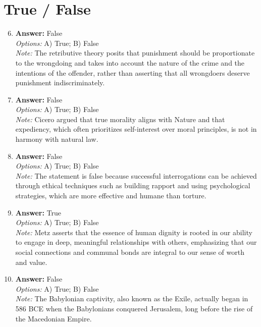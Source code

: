 \documentclass[12pt]{article}
\begin{document}
\section*{True / False}
\begin{enumerate}[label=\arabic*.]
\setcounter{enumi}{5}
\item \textbf{Answer:} False
\\ \textit{Options:} A) True; B) False
\\ \textit{Note:} The retributive theory posits that punishment should be proportionate to the wrongdoing and takes into account the nature of the crime and the intentions of the offender, rather than asserting that all wrongdoers deserve punishment indiscriminately.
\item \textbf{Answer:} False
\\ \textit{Options:} A) True; B) False
\\ \textit{Note:} Cicero argued that true morality aligns with Nature and that expediency, which often prioritizes self-interest over moral principles, is not in harmony with natural law.
\item \textbf{Answer:} False
\\ \textit{Options:} A) True; B) False
\\ \textit{Note:} The statement is false because successful interrogations can be achieved through ethical techniques such as building rapport and using psychological strategies, which are more effective and humane than torture.
\item \textbf{Answer:} True
\\ \textit{Options:} A) True; B) False
\\ \textit{Note:} Metz asserts that the essence of human dignity is rooted in our ability to engage in deep, meaningful relationships with others, emphasizing that our social connections and communal bonds are integral to our sense of worth and value.
\item \textbf{Answer:} False
\\ \textit{Options:} A) True; B) False
\\ \textit{Note:} The Babylonian captivity, also known as the Exile, actually began in 586 BCE when the Babylonians conquered Jerusalem, long before the rise of the Macedonian Empire.
\end{enumerate}
\end{document}

